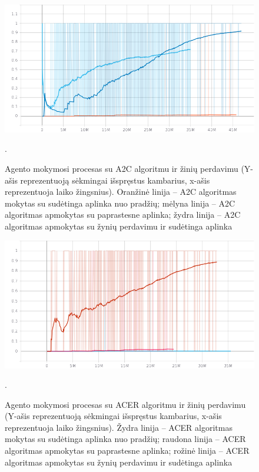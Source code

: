 \documentclass{VUMIFPSbakalaurinis}
\begin{document}
{	\begin{figure}[H]
		\centering
		\includegraphics[scale=0.5]{img/graphs/a2c_completions}
		\caption{Agento mokymosi procesas su A2C algoritmu ir žinių perdavimu (Y-ašis reprezentuoją sėkmingai išspręstus kambarius, x-ašis reprezentuoja laiko žingsnius). Oranžinė linija -- A2C algoritmas mokytas su sudėtinga aplinka nuo pradžių; mėlyna linija -- A2C algoritmas apmokytas su paprastesne aplinka; žydra linija -- A2C algoritmas apmokytas su žynių perdavimu ir sudėtinga aplinka}.
		\label{img:a2c_completions}
	\end{figure}
	\begin{figure}[H]
		\centering
		\includegraphics[scale=0.5]{img/graphs/acer_completions}
		\caption{Agento mokymosi procesas su ACER algoritmu ir žinių perdavimu (Y-ašis reprezentuoją sėkmingai išspręstus kambarius, x-ašis reprezentuoja laiko žingsnius). Žydra linija -- ACER algoritmas mokytas su sudėtinga aplinka nuo pradžių; raudona linija -- ACER algoritmas apmokytas su paprastesne aplinka; rožinė linija -- ACER algoritmas apmokytas su žynių perdavimu ir sudėtinga aplinka}.
		\label{img:acer_completions}
	\end{figure}
	\begin{figure}[H]
		\centering

\end{figure}}
\end{document}
